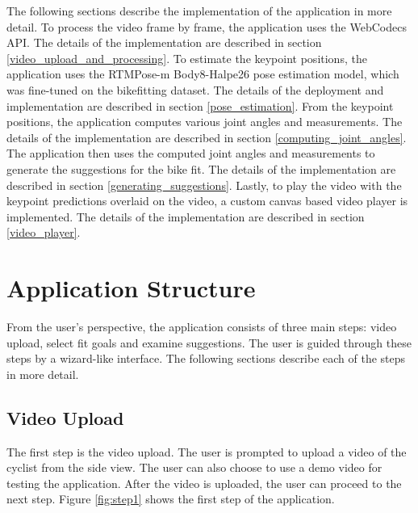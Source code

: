 The following sections describe the implementation of the application in more detail. To process the video frame by frame, the application uses the WebCodecs API. The details of the implementation are described in section \ref{video_upload_and_processing}. To estimate the keypoint positions, the application uses the RTMPose-m Body8-Halpe26 pose estimation model, which was fine-tuned on the bikefitting dataset. The details of the deployment and implementation are described in section \ref{pose_estimation}. From the keypoint positions, the application computes various joint angles and measurements. The details of the implementation are described in section \ref{computing_joint_angles}. The application then uses the computed joint angles and measurements to generate the suggestions for the bike fit. The details of the implementation are described in section \ref{generating_suggestions}. Lastly, to play the video with the keypoint predictions overlaid on the video, a custom canvas based video player is implemented. The details of the implementation are described in section \ref{video_player}.
\section{Application Structure}
\label{application_structure}
From the user's perspective, the application consists of three main steps: video upload, select fit goals and examine suggestions. The user is guided through these steps by a wizard-like interface. The following sections describe each of the steps in more detail.


\subsection{Video Upload} The first step is the video upload. The user is prompted to upload a video of the cyclist from the side view. The user can also choose to use a demo video for testing the application. After the video is uploaded, the user can proceed to the next step. Figure \ref{fig:step1} shows the first step of the application.

